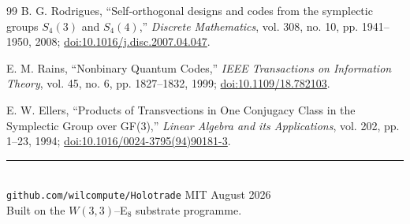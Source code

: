 \documentclass[11pt,letterpaper]{article}
\newcommand{\W}{\ensuremath{W(3,3)}}
\begin{document}
\begin{thebibliography}{99}
B. G. Rodrigues,
``Self-orthogonal designs and codes from the symplectic groups $S_4(3)$ and
$S_4(4)$,''
\emph{Discrete Mathematics}, vol. 308, no. 10, pp. 1941--1950, 2008;
\href{https://doi.org/10.1016/j.disc.2007.04.047}{doi:10.1016/j.disc.2007.04.047}.

E. M. Rains,
``Nonbinary Quantum Codes,''
\emph{IEEE Transactions on Information Theory}, vol. 45, no. 6,
pp. 1827--1832, 1999;
\href{https://doi.org/10.1109/18.782103}{doi:10.1109/18.782103}.

E. W. Ellers,
``Products of Transvections in One Conjugacy Class in the Symplectic Group
over GF(3),''
\emph{Linear Algebra and its Applications}, vol. 202, pp. 1--23, 1994;
\href{https://doi.org/10.1016/0024-3795(94)90181-3}{doi:10.1016/0024-3795(94)90181-3}.

\end{thebibliography}

\vspace{1.2cm}
\begin{center}
{\color{rule}\rule{0.4\textwidth}{0.6pt}}\\[10pt]
{\footnotesize\color{grey}
\texttt{github.com/wilcompute/Holotrade} \quad\textbar\quad MIT \quad\textbar\quad August 2026\\[3pt]
Built on the \W{}--E$_8$ substrate programme.}
\end{center}
\end{document}
